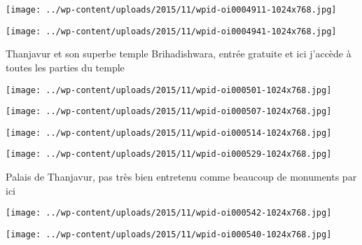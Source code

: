 \centerline{\texttt{[image: ../wp-content/uploads/2015/11/wpid-oi0004911-1024x768.jpg]} } 
 \newline
 \newline
\centerline{\texttt{[image: ../wp-content/uploads/2015/11/wpid-oi0004941-1024x768.jpg]} } 
 \newline
 Thanjavur et son superbe temple Brihadishwara, entrée gratuite et ici j'accède à toutes les parties du temple \newline
 \newline
\centerline{\texttt{[image: ../wp-content/uploads/2015/11/wpid-oi000501-1024x768.jpg]} } 
 \newline
 \newline
\centerline{\texttt{[image: ../wp-content/uploads/2015/11/wpid-oi000507-1024x768.jpg]} } 
 \newline
 \newline
\centerline{\texttt{[image: ../wp-content/uploads/2015/11/wpid-oi000514-1024x768.jpg]} } 
 \newline
 \newline
\centerline{\texttt{[image: ../wp-content/uploads/2015/11/wpid-oi000529-1024x768.jpg]} } 
 \newline
 Palais de Thanjavur, pas très bien entretenu comme beaucoup de monuments par ici \newline
 \newline
\centerline{\texttt{[image: ../wp-content/uploads/2015/11/wpid-oi000542-1024x768.jpg]} } 
 \newline
 \newline
\centerline{\texttt{[image: ../wp-content/uploads/2015/11/wpid-oi000540-1024x768.jpg]} } 
 \newline

\newpage
 
